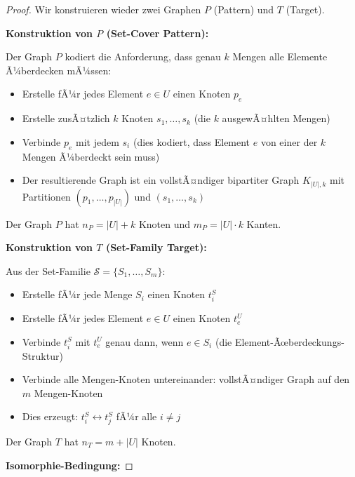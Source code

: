 ﻿\documentclass[a4paper,12pt]{article}
\theoremstyle{definition}
\begin{document}
\begin{proof}
	Wir konstruieren wieder zwei Graphen $P$ (Pattern) und $T$ (Target).
	
	\textbf{Konstruktion von $P$ (Set-Cover Pattern):}
	
	Der Graph $P$ kodiert die Anforderung, dass genau $k$ Mengen alle Elemente Ã¼berdecken mÃ¼ssen:
	\begin{itemize}
		\item Erstelle fÃ¼r jedes Element $e \in U$ einen Knoten $p_e$
		\item Erstelle zusÃ¤tzlich $k$ Knoten $s_1, \ldots, s_k$ (die $k$ ausgewÃ¤hlten Mengen)
		\item Verbinde $p_e$ mit jedem $s_i$ (dies kodiert, dass Element $e$ von einer der $k$ Mengen Ã¼berdeckt sein muss)
		\item Der resultierende Graph ist ein vollstÃ¤ndiger bipartiter Graph $K_{|U|, k}$ mit Partitionen $(p_1, \ldots, p_{|U|})$ und $(s_1, \ldots, s_k)$
	\end{itemize}
	
	Der Graph $P$ hat $n_P = |U| + k$ Knoten und $m_P = |U| \cdot k$ Kanten.
	
	\textbf{Konstruktion von $T$ (Set-Family Target):}
	
	Aus der Set-Familie $\mathcal{S} = \{S_1, \ldots, S_m\}$:
	\begin{itemize}
		\item Erstelle fÃ¼r jede Menge $S_i$ einen Knoten $t_i^S$
		\item Erstelle fÃ¼r jedes Element $e \in U$ einen Knoten $t_e^U$
		\item Verbinde $t_i^S$ mit $t_e^U$ genau dann, wenn $e \in S_i$ (die Element-Ãœberdeckungs-Struktur)
		\item Verbinde alle Mengen-Knoten untereinander: vollstÃ¤ndiger Graph auf den $m$ Mengen-Knoten
		\item Dies erzeugt: $t_i^S \leftrightarrow t_j^S$ fÃ¼r alle $i \neq j$
	\end{itemize}
	
	Der Graph $T$ hat $n_T = m + |U|$ Knoten.
	
	\textbf{Isomorphie-Bedingung:}
	

\end{proof}
\end{document}
